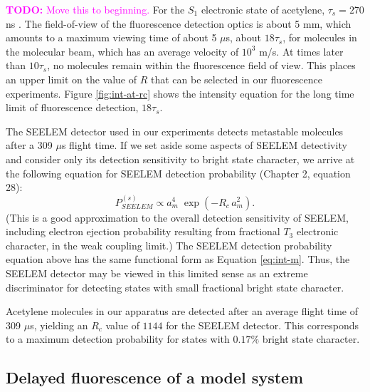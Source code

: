 \documentclass[12pt]{mitthesis}
\newcommand{\TODO} [1]{\textcolor{magenta}{\textbf{TODO:} #1}}
\begin{document}
\TODO{Move this to beginning.}  For the $S_1$ electronic state of
acetylene, $\tau_s=270$ ns \cite{ochi91}.  The field-of-view of the
fluorescence detection optics is about 5 mm, which amounts to a
maximum viewing time of about 5 $\mu$s, about $18\tau_s$, for
molecules in the molecular beam, which has an average velocity of
$10^3$ m/s.  At times later than $10\tau_s$, no molecules remain
within the fluorescence field of view.  This places an upper limit on
the value of $R$ that can be selected in our fluorescence experiments.
Figure \ref{fig:int-at-rc} shows the intensity equation for the long
time limit of fluorescence detection, $18\tau_s$.

The SEELEM detector used in our experiments detects metastable
molecules after a 309 $\mu$s flight time.  If we set aside some
aspects of SEELEM detectivity and consider only its detection
sensitivity to bright state character, we arrive at the following
equation for SEELEM detection probability (Chapter 2, equation 28):
\begin{equation}
  \label{eq:seelem-prob-s}
  P_{SEELEM}^{(s)} \propto a_m^4 \; \exp \left( -R_c \, a_m^2 \right).
\end{equation}
(This is a good approximation to the overall detection sensitivity of
SEELEM, including electron ejection probability resulting from
fractional $T_3$ electronic character, in the weak coupling limit.)
The SEELEM detection probability equation above has the same
functional form as Equation \ref{eq:int-m}.  Thus, the SEELEM detector
may be viewed in this limited sense as an extreme discriminator for
detecting states with small fractional bright state character.

Acetylene molecules in our apparatus are detected after an average
flight time of 309 $\mu$s, yielding an $R_c$ value of $1144$ for the
SEELEM detector.  This corresponds to a maximum detection probability
for states with $0.17\%$ bright state character.

\subsection{Delayed fluorescence of a model system}
\end{document}
